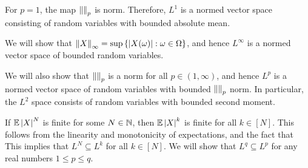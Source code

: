 \documentclass[letterpaper,10pt,english]{article}
\begin{document}
\begin{rem}
For $p=1$, the map $\left\lVert\right\rVert_p$ is norm. 
Therefore, $L^1$ is a normed vector space consisting of random variables with bounded absolute mean.
\end{rem}
\begin{rem}
We will show that $\left\lVert X\right\rVert_\infty = \sup\left\{\left\lvert X(\omega)\right\rvert:\omega\in \Omega\right\}$, 
and hence $L^\infty$ is a normed vector space of bounded random variables. 
\end{rem}
\begin{rem}
We will also show that $\left\lVert\right\rVert_p$ is a norm for all $p \in (1, \infty)$, 
and hence $L^p$ is a normed vector space of random variables with bounded $\left\lVert\right\rVert_p$ norm. 
In particular, the $L^2$ space consists of random variables with bounded second moment.
\end{rem}
\begin{rem}
If $\mathbb{E}\left\lvert X\right\rvert^N$ is finite for some $N \in \mathbb{N}$, 
then $\mathbb{E}\left\lvert X\right\rvert^k$ is finite for all $k \in [N]$. 
This follows from the linearity and monotonicity of expectations, and the fact that 
This implies that $L^N \subseteq L^k$ for all $k \in [N]$. 
We will show that $L^{q} \subseteq L^p$ for any real numbers $1 \le p \le q$. 
\end{rem}

\end{document}
